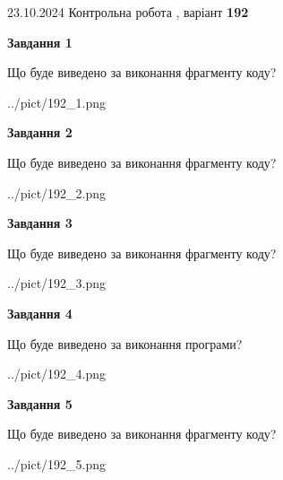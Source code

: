 \documentclass[12pt, ukrainian]{article}
\begin{document}
{\Large{23.10.2024 Контрольна робота , варіант  \No \textbf { 192 }\par}}
{
\begin {large}
{\begin {center}\textbf{Завдання 1}\end {center}}

Що буде виведено за виконання фрагменту коду?\par
\begin{center}
	{../pict/192_1.png}
\end{center}
\newpage

{\begin {center}\textbf{Завдання 2}\end {center}}

Що буде виведено за виконання фрагменту коду?\par
\begin{center}
	{../pict/192_2.png}
\end{center}
\newpage

{\begin {center}\textbf{Завдання 3}\end {center}}

Що буде виведено за виконання фрагменту коду?\par
\begin{center}
	{../pict/192_3.png}
\end{center}
\newpage

{\begin {center}\textbf{Завдання 4}\end {center}}

Що буде виведено за виконання програми?\par
\begin{center}
	{../pict/192_4.png}
\end{center}
\newpage

{\begin {center}\textbf{Завдання 5}\end {center}}

Що буде виведено за виконання фрагменту коду?\par
\begin{center}
	{../pict/192_5.png}
\end{center}
\newpage


\end{large}}
\end{document}
